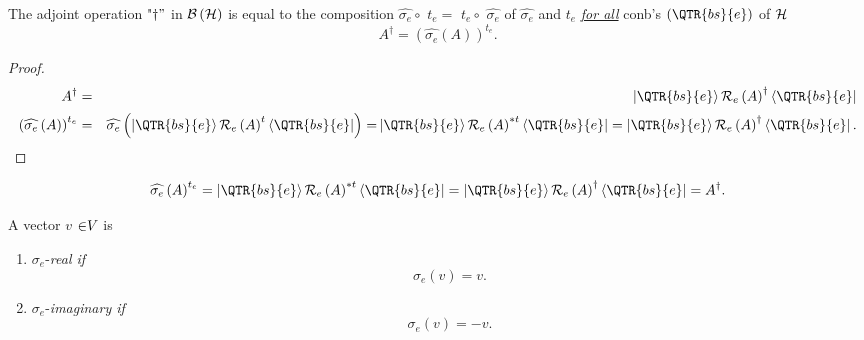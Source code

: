\begin{lemma}
The adjoint operation "$\dagger "$ in ${\cal B}\left( {\cal H}\right) $ is
equal to the composition $\widehat{\sigma _{e}}\circ $ $t_{e}=$ $t_{e}\circ $
$\widehat{\sigma _{e}}$ of \thinspace $\widehat{\sigma _{e}}$ and $t_{e}$ 
\underline{{\em for all}} conb's $\left( \QTR{bs}{e}\right) $ of ${\cal H}$ 
\begin{equation}
A^{\dagger }=\left( \widehat{\sigma _{e}}\left( A\right) \right) ^{t_{e}}.
\end{equation}

\begin{proof}
\begin{eqnarray}
A^{\dagger } &=&\left\vert \QTR{bs}{e}\right\rangle {\cal R}_{e}\left(
A\right) ^{\dagger }\left\langle \QTR{bs}{e}\right\vert  \\
\left( \widehat{\sigma _{e}}\left( A\right) \right) ^{t_{e}} &=&\widehat{%
\sigma _{e}}\left( \stackrel{}{\left\vert \QTR{bs}{e}\right\rangle {\cal R}%
_{e}\left( A\right) ^{t}\left\langle \QTR{bs}{e}\right\vert }\right) =\,%
\stackrel{}{\left\vert \QTR{bs}{e}\right\rangle {\cal R}_{e}\left( A\right)
^{\ast t}\left\langle \QTR{bs}{e}\right\vert =\left\vert \QTR{bs}{e}%
\right\rangle {\cal R}_{e}\left( A\right) ^{\dagger }\left\langle \QTR{bs}{e}%
\right\vert .}
\end{eqnarray}
\end{proof} 
\begin{equation}
\widehat{\sigma _{e}}\left( A\right) ^{t_{e}}=\left\vert \QTR{bs}{e}%
\right\rangle {\cal R}_{e}\left( A\right) ^{\ast t}\left\langle \QTR{bs}{e}%
\right\vert =\left\vert \QTR{bs}{e}\right\rangle {\cal R}_{e}\left( A\right)
^{\dagger }\left\langle \QTR{bs}{e}\right\vert =A^{\dagger }.
\end{equation}
\end{lemma}

\begin{definition}
A vector $v$ ${\cal \in }V$ is

\begin{enumerate}
\item $\sigma _{e}$-{\em real if }%
\begin{equation}
\sigma _{e}\left( v\right) =v.
\end{equation}

\item $\sigma _{e}$-{\em imaginary if }%
\begin{equation}
\sigma _{e}\left( v\right) =-v.
\end{equation}
\end{enumerate}
\end{definition}

